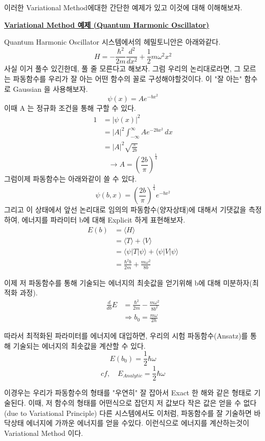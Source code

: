 \documentclass[11pt]{article}
\begin{document}
\begin{enumerate}[label=2)]
\begin{enumerate}[label=*]
\end{enumerate}

이러한 Variational Method에대한 간단한 예제가 있고 이것에 대해 이해해보자. 

\begin{mdframed}
\underline{\textbf{Variational Method 예제 (Quantum Harmonic Oscillator)}}

Quantum Harmonic Oscillator 시스템에서의 헤밀토니안은 아래와같다. 
\[H = -\frac{\hbar^2}{2m}\frac{d^2}{dx^2} + \frac{1}{2}m\omega^2 x^2 \]
사실 이거 풀수 있긴한데, 풀 줄 모른다고 해보자. 그럼 우리의 논리대로라면, 그 모르는 파동함수를 우리가 잘 아는 어떤 함수의 꼴로 구성해야할것이다. 
이 "잘 아는" 함수로 Gaussian 을 사용해보자. 
\[
\psi(x) = Ae^{-bx^2}
\]
이때 A 는 정규화 조건을 통해 구할 수 있다. 
\begin{align*}
1 &= |\psi(x)|^2  \\
&= |A|^2 \int_{-\infty}^{\infty} Ae^{-2bx^2} \, dx \\
&= |A|^2 \sqrt{\frac{\pi}{2b}}
\end{align*}
\[
\longrightarrow A = \left(\frac{2b}{\pi}\right)^{\frac{1}{4}}
\]
그럼이제 파동함수는 아래와같이 쓸 수 있다. 
\[
\psi(b,x) = \left(\frac{2b}{\pi}\right)^{\frac{1}{4}}e^{-bx^2}
\]
그리고 이 상태에서 앞선 논리대로 임의의 파동함수(양자상태)에 대해서 기댓값을 측정하여, 
에너지를 파라미터 b에 대해 Explicit 하게 표현해보자.
\begin{align*}
E(b) &= \langle H \rangle \\
&= \langle T \rangle + \langle V \rangle \\
&=\langle \psi|T|\psi \rangle + \langle \psi|V|\psi \rangle \\
&=\frac{\hbar^2 b}{2m} + \frac{m\omega^2}{8b}
\end{align*}


이제 저 파동함수를 통해 기술되는 에너지의 최솟값을 얻기위해 b에 대해 미분하자(최적화 과정). 
\begin{align*}
\frac{d}{db} E &= \frac{\hbar^2}{2m} - \frac{m \omega^2}{8b^2} \\
&\Longrightarrow b_0 = \frac{m\omega}{2\hbar}
\end{align*}

따라서 최적화된 파라미터를 에너지에 대입하면, 우리의 시험 파동함수(Ansatz)를 통해 기술되는 에너지의 최솟값을 계산할 수 있다. 
\[
E(b_0) = \frac{1}{2}\hbar\omega
\]
\[
cf, \quad E_{Analytic} = \frac{1}{2}\hbar\omega
\]
\end{mdframed}
이경우는 우리가 파동함수의 형태를 "우연히" 잘 잡아서 Exact 한 해와 같은 형태로 기술된다. 
이때, 저 함수의 형태를 어떤식으로 잡던지 저 값보다 작은 값은 얻을 수 없다(due to Variational Principle)
다른 시스템에서도 이처럼, 파동함수를 잘 기술하면 바닥상태 에너지에 가까운 에너지를 얻을 수있다. 
이런식으로 에너지를 계산하는것이 Variational Method 이다. 


\end{enumerate}
\end{document}

